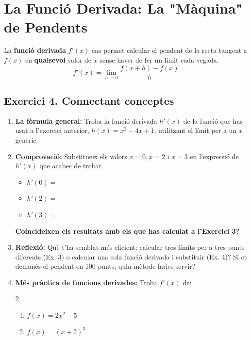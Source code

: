\documentclass[12pt,a4paper]{article}
\begin{document}
\newpage 

\section*{La Funció Derivada: La "Màquina" de Pendents}

La \textbf{funció derivada} $f'(x)$ ens permet calcular el pendent de la recta tangent a $f(x)$ en \textbf{qualsevol} valor de $x$ sense haver de fer un límit cada vegada.
\[ f'(x) = \lim_{h \to 0} \frac{f(x+h) - f(x)}{h} \]

\subsection*{Exercici 4. Connectant conceptes}

\begin{enumerate}[label=\textbf{\arabic*.}]
    \item \textbf{La fòrmula general:} Troba la funció derivada $h'(x)$ de la funció que has usat a l'exercici anterior, $h(x) = x^2 - 4x + 1$, utilitzant el límit per a un $x$ genèric.
    \vspace{0.2cm}

    \item \textbf{Comprovació:} Substitueix els valors $x=0, x=2$ i $x=3$ en l'expressió de $h'(x)$ que acabes de trobar.
    \begin{itemize}
        \item $h'(0) = $
        \item $h'(2) = $
        \item $h'(3) = $
    \end{itemize}
    \textbf{Coincideixen els resultats amb els que has calculat a l'Exercici 3?}

    \item \textbf{Reflexió:} Què t'ha semblat més eficient: calcular tres límits per a tres punts diferents (Ex. 3) o calcular una sola funció derivada i substituir (Ex. 4)? Si et demanés el pendent en 100 punts, quin mètode faries servir?
    \vspace{0.2cm}

    \item \textbf{Més pràctica de funcions derivades:} Troba $f'(x)$ de:
    \begin{multicols}{2}
    \begin{enumerate}[label=\alph*)]
        \item $f(x) = 2x^2 - 5$
        \item $f(x) = (x + 2)^3$
    \end{enumerate}
    \end{multicols}
\end{enumerate}
\end{document}
